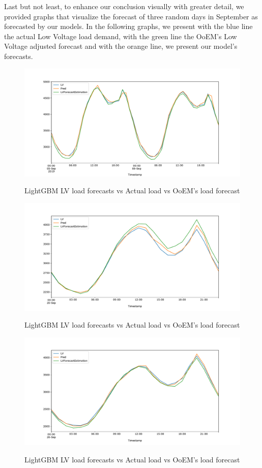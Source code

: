 Last but not least, to enhance our conclusion visually with greater detail, we provided graphs that visualize the forecast of three random days in September as forecasted by our models. In the following graphs, we present with the blue line the actual Low Voltage load demand, with the green line the OoEM's Low Voltage adjusted forecast and with the orange line, we present our model's forecasts. 
\begin{figure}[h!]
\centering
\includegraphics[width=1\linewidth]{project/last1.pdf}
\label{fig:felix}
\caption{LightGBM LV load forecasts vs Actual load vs OoEM’s load forecast}
\end{figure}
\begin{figure}[h!]
\centering
\includegraphics[width=1\linewidth]{project/last2.pdf}
\label{fig:felix}
\caption{LightGBM LV load forecasts vs Actual load vs OoEM’s load forecast}
\end{figure}
\begin{figure}[h!]
\centering
\includegraphics[width=1\linewidth]{project/last3.pdf}
\label{fig:felix}
\caption{LightGBM LV load forecasts vs Actual load vs OoEM’s load forecast}
\end{figure}